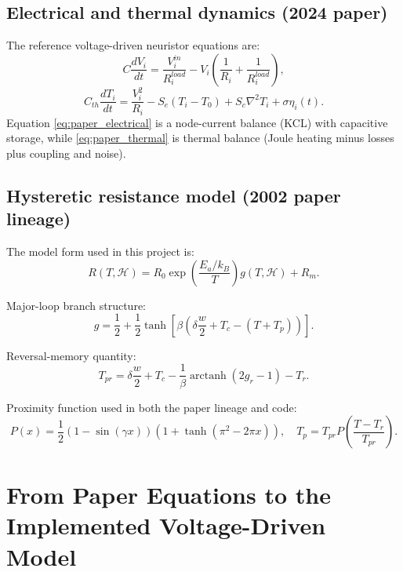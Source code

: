\documentclass[11pt]{article}
\begin{document}
\subsection{Electrical and thermal dynamics (2024 paper)}
The reference voltage-driven neuristor equations are:
\begin{equation}
C\frac{dV_i}{dt}=\frac{V^{in}_i}{R^{load}_i}-V_i\left(\frac{1}{R_i}+\frac{1}{R^{load}_i}\right),
\label{eq:paper_electrical}
\end{equation}
\begin{equation}
C_{th}\frac{dT_i}{dt}=\frac{V_i^2}{R_i}-S_e(T_i-T_0)+S_c\nabla^2T_i+\sigma\eta_i(t).
\label{eq:paper_thermal}
\end{equation}
Equation \eqref{eq:paper_electrical} is a node-current balance (KCL) with capacitive storage, while \eqref{eq:paper_thermal} is thermal balance (Joule heating minus losses plus coupling and noise).

\subsection{Hysteretic resistance model (2002 paper lineage)}
The model form used in this project is:
\begin{equation}
R(T,\mathcal{H}) = R_0\exp\!\left(\frac{E_a/k_B}{T}\right)g(T,\mathcal{H}) + R_m.
\label{eq:R_model}
\end{equation}

Major-loop branch structure:
\begin{equation}
g = \frac{1}{2} + \frac{1}{2}\tanh\!\left[\beta\left(\delta\frac{w}{2}+T_c-(T+T_p)\right)\right].
\label{eq:g_model}
\end{equation}

Reversal-memory quantity:
\begin{equation}
T_{pr}=\delta\frac{w}{2}+T_c-\frac{1}{\beta}\operatorname{arctanh}(2g_r-1)-T_r.
\label{eq:Tpr}
\end{equation}

Proximity function used in both the paper lineage and code:
\begin{equation}
P(x)=\frac{1}{2}\left(1-\sin(\gamma x)\right)\left(1+\tanh\!\left(\pi^2-2\pi x\right)\right),
\quad
T_p = T_{pr}P\!\left(\frac{T-T_r}{T_{pr}}\right).
\label{eq:P}
\end{equation}

\section{From Paper Equations to the Implemented Voltage-Driven Model}
\end{document}
